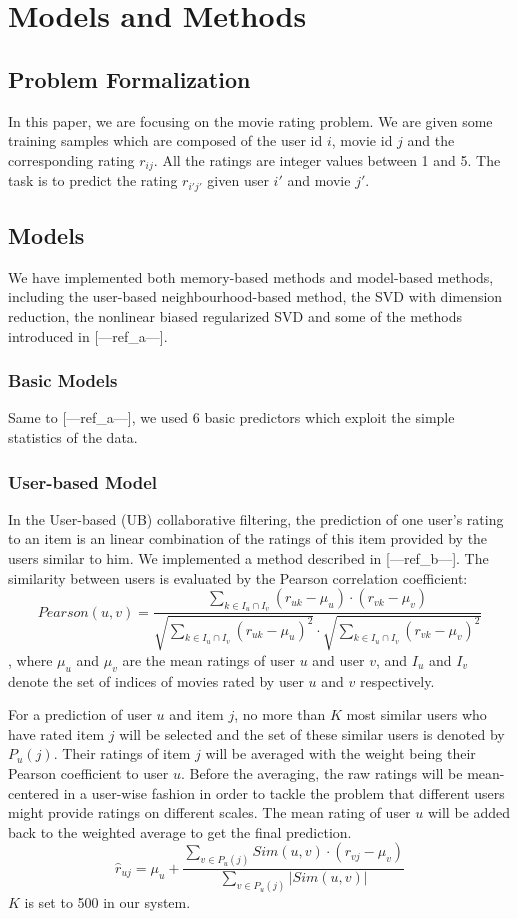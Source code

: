 \documentclass[10pt,conference,compsocconf]{IEEEtran}
\begin{document}
\section{Models and Methods}
\subsection{Problem Formalization}
In this paper, we are focusing on the movie rating problem. We are given some training samples which are composed of the user id $i$, movie id $j$ and the corresponding rating $r_{ij}$. All the ratings are integer values between 1 and 5. The task is to predict the rating $r_{i'j'}$ given user $i'$ and movie $j'$.

\subsection{Models}
We have implemented both memory-based methods and model-based methods, including the user-based neighbourhood-based method, the SVD with dimension reduction, the nonlinear biased regularized SVD and some of the methods introduced in [---ref\_a---].
\subsubsection{Basic Models}
Same to [---ref\_a---], we used 6 basic predictors which exploit the simple statistics of the data.

\subsubsection{User-based Model}
In the User-based (UB) collaborative filtering, the prediction of one user's rating to an item is an linear combination of the ratings of this item provided by the users similar to him. We implemented a method described in [---ref\_b---]. The similarity between users is evaluated by the Pearson correlation coefficient:
$$Pearson(u,v) = \frac{{\sum\limits_{k \in {I_u} \cap {I_v}} {({r_{uk}} - {\mu _u}) \cdot ({r_{vk}} - {\mu _v})} }}{{\sqrt {\sum\limits_{k \in {I_u} \cap {I_v}} {{{({r_{uk}} - {\mu _u})}^2}} }  \cdot \sqrt {\sum\limits_{k \in {I_u} \cap {I_v}} {{{({r_{vk}} - {\mu _v})}^2}} } }}$$
, where $\mu _u$ and $\mu _v$ are the mean ratings of user $u$ and user $v$, and ${I_u}$ and ${I_v}$ denote the set of indices of movies rated by user $u$ and $v$ respectively.

For a prediction of user $u$ and item $j$, no more than $K$ most similar users who have rated item $j$ will be selected and the set of these similar users is denoted by ${P_u}(j)$. Their ratings of item $j$ will be averaged with the weight being their Pearson coefficient to user $u$. Before the averaging, the raw ratings will be mean-centered in a user-wise fashion in order to tackle the problem that different users might provide ratings on different scales. The mean rating of user $u$ will be added back to the weighted average to get the final prediction.
$${\hat r_{uj}} = {\mu _u} + \frac{{\sum\limits_{v \in {P_u}(j)} {Sim(u,v) \cdot ({r_{vj}} - {\mu _v})} }}{{\sum\limits_{v \in {P_u}(j)} {\left| {Sim(u,v)} \right|} }}$$
$K$ is set to 500 in our system.
\end{document}
